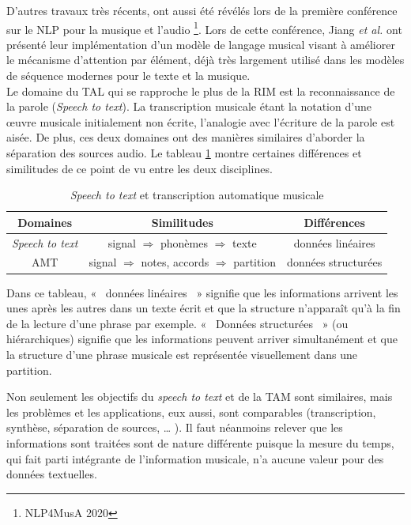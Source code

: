 D’autres travaux très récents, ont aussi été révélés lors de la première
conférence sur le NLP pour la musique et l’audio \footnote{NLP4MusA 2020}. Lors
de cette conférence, Jiang \textit{et al.} \cite{Jiang2020DiscoveringMR} ont
présenté leur implémentation d’un modèle de langage musical visant à améliorer
le mécanisme d’attention par élément, déjà très largement utilisé dans les
modèles de séquence modernes pour le texte et la musique.\\

Le domaine du TAL qui se rapproche le plus de la RIM est la reconnaissance de
la parole (\textit{Speech to text}). La transcription musicale étant la notation d’une
œuvre musicale initialement non écrite, l’analogie avec l’écriture de la parole
est aisée. De plus, ces deux domaines ont des manières similaires d’aborder
la séparation des sources audio. Le tableau \ref{spToTxt_vs_TAM} montre
certaines différences et similitudes de ce point de vu entre les deux
disciplines.

\begin{table}[h]
	\centering
	\begin{tabular}{|c|c|c|} \hline
	Domaines & Similitudes & Différences \\ \hline
	\textit{Speech to text} & signal $\Rightarrow$ phonèmes $\Rightarrow$
    texte & données linéaires \footnotemark\\
	AMT & signal $\Rightarrow$ notes, accords $\Rightarrow$ partition & données
    structurées\footnotemark\\ \hline
	\end{tabular}
	\caption{\textit{Speech to text} et transcription automatique musicale}
	\label{spToTxt_vs_TAM}
\end{table}
Dans ce tableau, «~ données linéaires~ » signifie que les informations arrivent
les unes après les autres dans un texte écrit et que la structure n’apparaît
qu’à la fin de la lecture d’une phrase par exemple. «~ Données structurées~ » (ou
hiérarchiques) signifie que les informations peuvent arriver simultanément et
que la structure d’une phrase musicale est représentée visuellement dans une
partition.

Non seulement les objectifs du \textit{speech to text} et de la TAM sont
similaires, mais les problèmes et les applications, eux aussi, sont comparables
(transcription, synthèse, séparation de sources, … ). Il faut néanmoins relever
que les informations sont traitées sont de nature différente puisque la mesure
du temps, qui fait parti intégrante de l’information musicale, n’a aucune
valeur pour des données textuelles.

